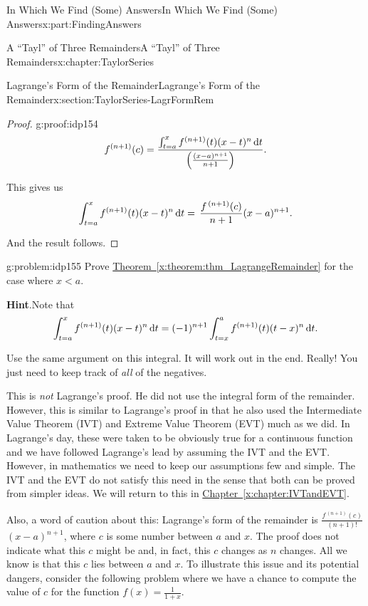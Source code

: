 \documentclass[oneside,10pt,]{book}
\newcommand{\blocktitlefont}{\relax}
\newcommand{\xreffont}{\relax}
\numberwithin{equation}{section}
\newcommand{\dx}[1]{\,{\rm d}#1}
\newcommand{\lt}{<}
\begin{document}
\begin{partptx}{In Which We Find (Some) Answers}{}{In Which We Find (Some) Answers}{}{}{x:part:FindingAnswers}
\begin{chapterptx}{A ``Tayl'' of Three Remainders}{}{A ``Tayl'' of Three Remainders}{}{}{x:chapter:TaylorSeries}
\begin{sectionptx}{Lagrange's Form of the Remainder}{}{Lagrange's Form of the Remainder}{}{}{x:section:TaylorSeries-LagrFormRem}
\begin{proof}{}{g:proof:idp154}
\begin{equation*}
f^{(n+1)}(c)=\frac{\int_{t=a}^xf^{(n+1)}(t)(x-t)^n\dx{ t}}{\left( \frac{(x-a)^{n+1}}{n+1}\right)}\text{.}
\end{equation*}
%
\par
This gives us%
\begin{equation*}
\int_{t=a}^xf^{(n+1)}(t)(x-t)^n\dx{ t}=\,\frac{f^{\,(n+1)}(c)}{n+1}(x-a)^{n+1}\text{.}
\end{equation*}
%
\par
And the result follows.%
\end{proof}
\begin{problem}{}{g:problem:idp155}%
\index{Lagrange's form of the remainder!\(x\lt a\)} Prove \hyperref[x:theorem:thm_LagrangeRemainder]{Theorem~{\xreffont\ref{x:theorem:thm_LagrangeRemainder}}} for the case where \(x\lt a\).%
\par\smallskip%
\noindent\textbf{\blocktitlefont Hint}.\hypertarget{g:hint:idp156}{}\quad{}Note that%
\begin{equation*}
\int_{t=a}^xf^{(n+1)}(t)(x-t)^n\dx{ t}=(-1)^{n+1}\int_{t=x}^af^{(n+1)}(t)(t-x)^n\dx{ t}\text{.}
\end{equation*}
%
\par
Use the same argument on this integral.  It will work out in the end.  Really!  You just need to keep track of \emph{all} of the negatives.%
\end{problem}
This is \emph{not} Lagrange's proof.  He did not use the integral form of the remainder.  However, this is similar to Lagrange's proof in that he also used the Intermediate Value Theorem (IVT)  and Extreme Value Theorem (EVT)  much as we did.  In Lagrange's day, these were taken to be obviously true for a continuous function and we have followed Lagrange's  lead by assuming the IVT and the EVT. However, in mathematics we need to keep our assumptions few and simple.  The IVT and the EVT do not satisfy this need in the sense that both can be proved from simpler ideas.  We will return to this in \hyperref[x:chapter:IVTandEVT]{Chapter~{\xreffont\ref{x:chapter:IVTandEVT}}}.%
\par
Also, a word of caution about this: Lagrange's form of the remainder is \(\frac{f^{\,(n+1)}(c)}{(n+1)!}\) \((x-a)^{n+1}\), where \(c\) is some number between \(a\) and \(x\).  The proof does not indicate what this \(c\) might be and, in fact, this \(c\) changes as \(n\) changes. All we know is that this \(c\) lies between \(a\) and \(x\).  To illustrate this issue and its potential dangers, consider the following problem where we have a chance to compute the value of \(c\) for the function \(f(x)=\frac{1}{1+x}\).%

\end{sectionptx}
\end{chapterptx}
\end{partptx}
\end{document}
